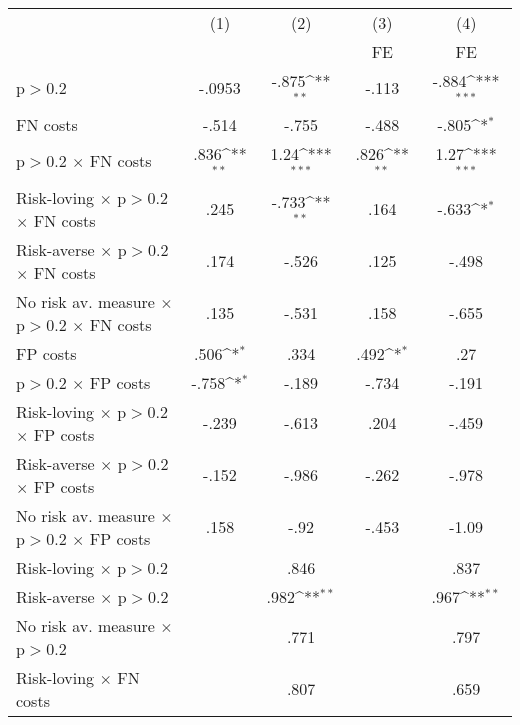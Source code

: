 {
\def\sym#1{\ifmmode^{#1}\else\(^{#1}\)\fi}
\begin{tabular}{l*{4}{c}}
\hline\hline
                &\multicolumn{1}{c}{(1)}&\multicolumn{1}{c}{(2)}&\multicolumn{1}{c}{(3)}&\multicolumn{1}{c}{(4)}\\
                &\multicolumn{1}{c}{}&\multicolumn{1}{c}{}&\multicolumn{1}{c}{FE}&\multicolumn{1}{c}{FE}\\
\hline
p$>$0.2         &   -.0953         &    -.875\sym{**} &    -.113         &    -.884\sym{***}\\
FN costs        &    -.514         &    -.755         &    -.488         &    -.805\sym{*}  \\
p$>$0.2 $\times$ FN costs&     .836\sym{**} &     1.24\sym{***}&     .826\sym{**} &     1.27\sym{***}\\
Risk-loving $\times$ p$>$0.2 $\times$ FN costs&     .245         &    -.733\sym{**} &     .164         &    -.633\sym{*}  \\
Risk-averse $\times$ p$>$0.2 $\times$ FN costs&     .174         &    -.526         &     .125         &    -.498         \\
No risk av. measure $\times$ p$>$0.2 $\times$ FN costs&     .135         &    -.531         &     .158         &    -.655         \\
FP costs        &     .506\sym{*}  &     .334         &     .492\sym{*}  &      .27         \\
p$>$0.2 $\times$ FP costs&    -.758\sym{*}  &    -.189         &    -.734         &    -.191         \\
Risk-loving $\times$ p$>$0.2 $\times$ FP costs&    -.239         &    -.613         &     .204         &    -.459         \\
Risk-averse $\times$ p$>$0.2 $\times$ FP costs&    -.152         &    -.986         &    -.262         &    -.978         \\
No risk av. measure $\times$ p$>$0.2 $\times$ FP costs&     .158         &     -.92         &    -.453         &    -1.09         \\
Risk-loving $\times$ p$>$0.2&                  &     .846         &                  &     .837         \\
Risk-averse $\times$ p$>$0.2&                  &     .982\sym{**} &                  &     .967\sym{**} \\
No risk av. measure $\times$ p$>$0.2&                  &     .771         &                  &     .797         \\
Risk-loving $\times$ FN costs&                  &     .807         &                  &     .659         \\

\end{tabular}}
